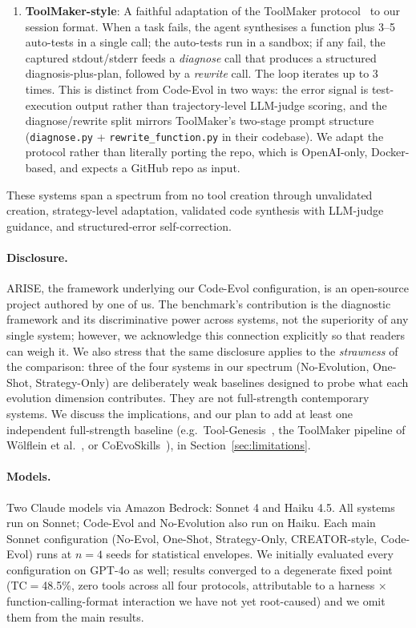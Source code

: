 \documentclass[sigplan,nonacm,natbib=false]{acmart}
\begin{document}
\begin{enumerate}
\item \textbf{ToolMaker-style}: A faithful adaptation of the ToolMaker protocol~\cite{wolflein2025toolmaker} to our session format. When a task fails, the agent synthesises a function plus 3--5 auto-tests in a single call; the auto-tests run in a sandbox; if any fail, the captured stdout/stderr feeds a \emph{diagnose} call that produces a structured diagnosis-plus-plan, followed by a \emph{rewrite} call. The loop iterates up to 3 times. This is distinct from Code-Evol in two ways: the error signal is test-execution output rather than trajectory-level LLM-judge scoring, and the diagnose/rewrite split mirrors ToolMaker's two-stage prompt structure (\texttt{diagnose.py} + \texttt{rewrite\_function.py} in their codebase). We adapt the protocol rather than literally porting the repo, which is OpenAI-only, Docker-based, and expects a GitHub repo as input.
\end{enumerate}

These systems span a spectrum from no tool creation through unvalidated creation, strategy-level adaptation, validated code synthesis with LLM-judge guidance, and structured-error self-correction.

\paragraph{Disclosure.} ARISE, the framework underlying our Code-Evol configuration, is an open-source project authored by one of us. The benchmark's contribution is the diagnostic framework and its discriminative power across systems, not the superiority of any single system; however, we acknowledge this connection explicitly so that readers can weigh it. We also stress that the same disclosure applies to the \emph{strawness} of the comparison: three of the four systems in our spectrum (No-Evolution, One-Shot, Strategy-Only) are deliberately weak baselines designed to probe what each evolution dimension contributes. They are not full-strength contemporary systems. We discuss the implications, and our plan to add at least one independent full-strength baseline (e.g.\ Tool-Genesis~\cite{xia2026toolgenesis}, the ToolMaker pipeline of W{\"o}lflein et al.~\cite{wolflein2025toolmaker}, or CoEvoSkills~\cite{zhang2026coevoskills}), in Section~\ref{sec:limitations}.

\paragraph{Models.} Two Claude models via Amazon Bedrock: Sonnet 4 and Haiku 4.5. All systems run on Sonnet; Code-Evol and No-Evolution also run on Haiku. Each main Sonnet configuration (No-Evol, One-Shot, Strategy-Only, CREATOR-style, Code-Evol) runs at $n=4$ seeds for statistical envelopes. We initially evaluated every configuration on GPT-4o as well; results converged to a degenerate fixed point (TC$=$48.5\%, zero tools across all four protocols, attributable to a harness$\,\times\,$function-calling-format interaction we have not yet root-caused) and we omit them from the main results.
\end{document}
